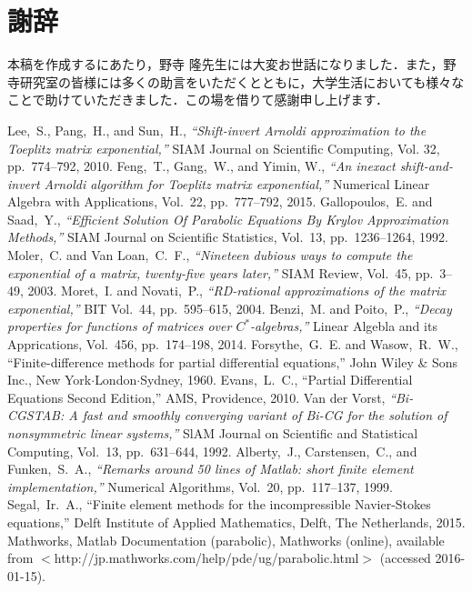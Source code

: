 \documentclass[a4paper,12pt]{nodlabpabw}
\begin{document}
\chapter*{謝辞}
本稿を作成するにあたり，野寺 隆先生には大変お世話になりました．また，野寺研究室の皆様には多くの助言をいただくとともに，大学生活においても様々なことで助けていただきました．この場を借りて感謝申し上げます．
%
\begin{thebibliography}{99}
Lee,~S., Pang,~H., and Sun,~H., \textsl{``Shift-invert Arnoldi approximation to the Toeplitz matrix exponential,''} SIAM Journal on Scientific Computing, Vol. 32, pp.\ 774--792, 2010.
Feng,~T., Gang,~W., and Yimin, W., \textsl{``An inexact shift-and-invert Arnoldi algorithm for Toeplitz matrix exponential,''} Numerical Linear Algebra with Applications, Vol.\ 22, pp.\ 777--792, 2015.
Gallopoulos,~E. and Saad,~Y., \textsl{``Efficient Solution Of Parabolic Equations By Krylov Approximation Methods,''} SIAM Journal on Scientific Statistics, Vol.\ 13, pp.\ 1236--1264, 1992.
Moler,~C. and Van Loan,~C.~F., \textsl{``Nineteen dubious ways to compute the exponential of a matrix, twenty-five years later,''} SIAM Review, Vol.\ 45, pp.\ 3--49, 2003.
Moret,~I. and Novati,~P., \textsl{``RD-rational approximations of the matrix exponential,''} BIT Vol.\ 44, pp.\ 595--615, 2004.
Benzi,~M. and Poito,~P., \textsl{``Decay properties for functions of matrices over $C^*$-algebras,''} Linear Algebla and its Apprications, Vol.\ 456, pp.\ 174--198, 2014.
Forsythe,~G.~E. and Wasow,~R.~W., ``Finite-difference methods for partial differential equations,'' John Wiley \& Sons Inc., New York$\cdot$London$\cdot$Sydney, 1960.
Evans,~L.~C., ``Partial Differential Equations Second Edition,'' AMS, Providence, 2010.
Van der Vorst, \textsl{``Bi-CGSTAB: A fast and smoothly converging variant of Bi-CG for the solution of nonsymmetric
linear systems,''} SlAM Journal on Scientific and Statistical Computing, Vol.\ 13, pp.\ 631--644, 1992.
Alberty,~J., Carstensen,~C., and Funken,~S.~A., \textsl{``Remarks around 50 lines of Matlab: short finite element implementation,''} Numerical Algorithms, Vol.\ 20, pp.\ 117--137, 1999. 
Segal,~Ir.~A., ``Finite element methods for the incompressible Navier-Stokes equations,'' Delft Institute of Applied Mathematics, Delft, The Netherlands, 2015.
Mathworks, Matlab Documentation (parabolic), Mathworks (online), available from $<$http://jp.mathworks.com/help/pde/ug/parabolic.html$>$ (accessed 2016-01-15).

\end{thebibliography}
\end{document}

